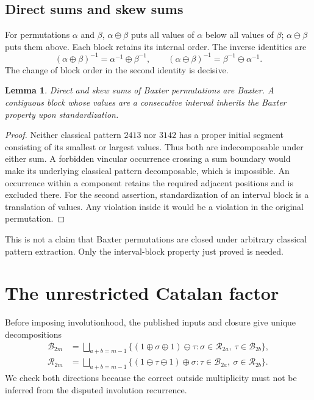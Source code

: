 \documentclass[11pt,letterpaper]{article}
\numberwithin{equation}{section}
\newtheorem{lemma}[theorem]{Lemma}
\theoremstyle{remark}\newtheorem{remark}[theorem]{Remark}
\newcommand{\BB}{\mathcal B}
\newcommand{\RR}{\mathcal R}
\begin{document}
\subsection{Direct sums and skew sums}\label{abx:en:sub:sums}
For permutations $\alpha$ and $\beta$, $\alpha\oplus\beta$ puts
all values of $\alpha$ below all values of $\beta$; $\alpha\ominus\beta$
puts them above. Each block retains its internal order. The inverse
identities are
\begin{equation}\label{abx:en:eq:sum-inverse}
 (\alpha\oplus\beta)^{-1}=\alpha^{-1}\oplus\beta^{-1},\qquad
 (\alpha\ominus\beta)^{-1}=\beta^{-1}\ominus\alpha^{-1}.
\end{equation}
The change of block order in the second identity is decisive.

\begin{lemma}\label{abx:en:lem:closure}
Direct and skew sums of Baxter permutations are Baxter. A contiguous
block whose values are a consecutive interval inherits the Baxter
property upon standardization.
\end{lemma}
\begin{proof}
Neither classical pattern $2413$ nor $3142$ has a proper initial
segment consisting of its smallest or largest values. Thus both are
indecomposable under either sum. A forbidden vincular occurrence
crossing a sum boundary would make its underlying classical pattern
decomposable, which is impossible. An occurrence within a component
retains the required adjacent positions and is excluded there.
For the second assertion, standardization of an interval block is a
translation of values. Any violation inside it would be a violation in
the original permutation.
\end{proof}
This is not a claim that Baxter permutations are closed under arbitrary
classical pattern extraction. Only the interval-block property just
proved is needed.

\section{The unrestricted Catalan factor}\label{abx:en:sec:catalan}
Before imposing involutionhood, the published inputs and closure give
unique decompositions
\begin{align}
\BB_{2m}
 &=\bigsqcup_{a+b=m-1}
 \{(1\oplus\sigma\oplus1)\ominus\tau:
       \sigma\in\RR_{2a},\ \tau\in\BB_{2b}\},\label{abx:en:eq:Bdec}\\
\RR_{2m}
 &=\bigsqcup_{a+b=m-1}
 \{(1\ominus\tau\ominus1)\oplus\sigma:
       \tau\in\BB_{2a},\ \sigma\in\RR_{2b}\}.\label{abx:en:eq:Rdec}
\end{align}
We check both directions because the correct outside multiplicity must
not be inferred from the disputed involution recurrence.
\end{document}
